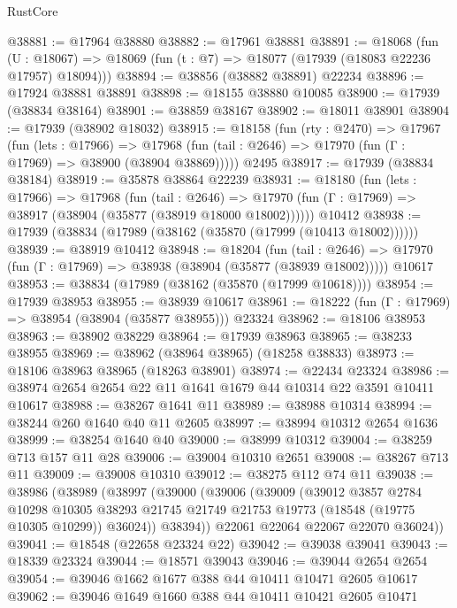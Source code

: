 \begin{lexlean}{RustCore}
\begin{coremodule}
@38881 := @17964 @38880
@38882 := @17961 @38881
@38891 := @18068
    (fun (U : @18067) => @18069 (fun (t : @7) => @18077 (@17939 (@18083 @22236 @17957) @18094)))
@38894 := @38856 (@38882 @38891) @22234
@38896 := @17924 @38881 @38891
@38898 := @18155 @38880 @10085
@38900 := @17939 (@38834 @38164)
@38901 := @38859 @38167
@38902 := @18011 @38901
@38904 := @17939 (@38902 @18032)
@38915 := @18158
    (fun (rty : @2470) =>
    @17967
      (fun (lets : @17966) =>
      @17968 (fun (tail : @2646) => @17970 (fun (Γ : @17969) => @38900 (@38904 @38869)))))
    @2495
@38917 := @17939 (@38834 @38184)
@38919 := @35878 @38864 @22239
@38931 := @18180
    (fun (lets : @17966) =>
    @17968
      (fun (tail : @2646) =>
      @17970 (fun (Γ : @17969) => @38917 (@38904 (@35877 (@38919 @18000 @18002))))))
    @10412
@38938 := @17939 (@38834 (@17989 (@38162 (@35870 (@17999 (@10413 @18002))))))
@38939 := @38919 @10412
@38948 := @18204
    (fun (tail : @2646) => @17970 (fun (Γ : @17969) => @38938 (@38904 (@35877 (@38939 @18002)))))
    @10617
@38953 := @38834 (@17989 (@38162 (@35870 (@17999 @10618))))
@38954 := @17939 @38953
@38955 := @38939 @10617
@38961 := @18222 (fun (Γ : @17969) => @38954 (@38904 (@35877 @38955))) @23324
@38962 := @18106 @38953
@38963 := @38902 @38229
@38964 := @17939 @38963
@38965 := @38233 @38955
@38969 := @38962 (@38964 @38965) (@18258 @38833)
@38973 := @18106 @38963 @38965 (@18263 @38901)
@38974 := @22434 @23324
@38986 := @38974 @2654 @2654 @22 @11 @1641 @1679 @44 @10314 @22 @3591 @10411 @10617
@38988 := @38267 @1641 @11
@38989 := @38988 @10314
@38994 := @38244 @260 @1640 @40 @11 @2605
@38997 := @38994 @10312 @2654 @1636
@38999 := @38254 @1640 @40
@39000 := @38999 @10312
@39004 := @38259 @713 @157 @11 @28
@39006 := @39004 @10310 @2651
@39008 := @38267 @713 @11
@39009 := @39008 @10310
@39012 := @38275 @112 @74 @11
@39038 := @38986
    (@38989
      (@38997
        (@39000
          (@39006
            (@39009
              (@39012
                @3857
                @2784
                @10298
                @10305
                @38293
                @21745
                @21749
                @21753
                @19773
                (@18548 (@19775 @10305 @10299))
                @36024))
            @38394))
        @22061
        @22064
        @22067
        @22070
        @36024))
@39041 := @18548 (@22658 @23324 @22)
@39042 := @39038 @39041
@39043 := @18339 @23324
@39044 := @18571 @39043
@39046 := @39044 @2654 @2654
@39054 := @39046 @1662 @1677 @388 @44 @10411 @10471 @2605 @10617
@39062 := @39046 @1649 @1660 @388 @44 @10411 @10421 @2605 @10471

\end{coremodule}
\end{lexlean}
